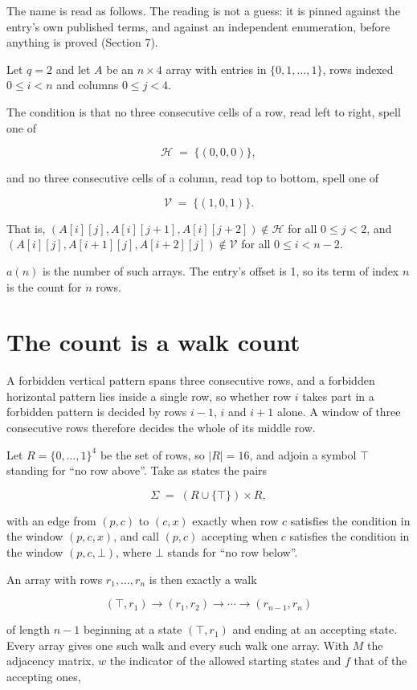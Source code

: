 \documentclass[11pt]{article}
\theoremstyle{definition}
\begin{document}
The name is read as follows. The reading is not a guess: it is pinned against the entry's own published terms, and against an independent enumeration, before anything is proved (Section 7).

Let $q = 2$ and let $A$ be an $n \times 4$ array with entries in $\{0,1,\dots,1\}$, rows indexed $0 \le i < n$ and columns $0 \le j < 4$.

The condition is that no three consecutive cells of a row, read left to right, spell one of

\[\mathcal{H} \;=\; \{(0,0,0)\},\]

and no three consecutive cells of a column, read top to bottom, spell one of

\[\mathcal{V} \;=\; \{(1,0,1)\}.\]

That is, $(A[i][j],A[i][j{+}1],A[i][j{+}2]) \notin \mathcal{H}$ for all $0 \le j < 2$, and $(A[i][j],A[i{+}1][j],A[i{+}2][j]) \notin \mathcal{V}$ for all $0 \le i < n-2$.

$a(n)$ is the number of such arrays. The entry's offset is 1, so its term of index $n$ is the count for $n$ rows.

\section{The count is a walk count}

A forbidden vertical pattern spans three consecutive rows, and a forbidden horizontal pattern lies inside a single row, so whether row $i$ takes part in a forbidden pattern is decided by rows $i-1$, $i$ and $i+1$ alone. A window of three consecutive rows therefore decides the whole of its middle row.

Let $R = \{0,\dots,1\}^{4}$ be the set of rows, so $|R| = 16$, and adjoin a symbol $\top$ standing for ``no row above''. Take as states the pairs

\[\Sigma \;=\; (R \cup \{\top\}) \times R,\]

with an edge from $(p,c)$ to $(c,x)$ exactly when row $c$ satisfies the condition in the window $(p,c,x)$, and call $(p,c)$ accepting when $c$ satisfies the condition in the window $(p,c,\bot)$, where $\bot$ stands for ``no row below''.

An array with rows $r_1,\dots,r_n$ is then exactly a walk

\[(\top,r_1) \to (r_1,r_2) \to \cdots \to (r_{n-1},r_n)\]

of length $n-1$ beginning at a state $(\top,r_1)$ and ending at an accepting state. Every array gives one such walk and every such walk one array. With $M$ the adjacency matrix, $w$ the indicator of the allowed starting states and $f$ that of the accepting ones,
\end{document}

